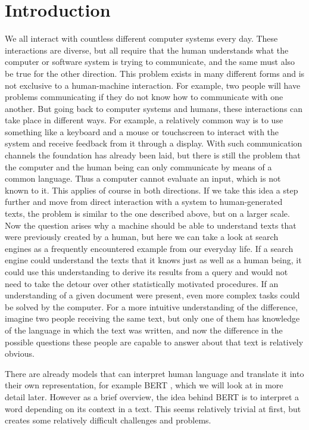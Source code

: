 \chapter{Introduction}
We all interact with countless different computer systems every day. These interactions are diverse, but all require that the human understands what the computer or software system is trying to communicate, and the same must also be true for the other direction. This problem exists in many different forms and is not exclusive to a human-machine interaction. For example, two people will have problems communicating if they do not know how to communicate with one another. But going back to computer systems and humans, these interactions can take place in different ways. For example, a relatively common way is to use something like a keyboard and a mouse or touchscreen to interact with the system and receive feedback from it through a display. With such communication channels the foundation has already been laid, but there is still the problem that the computer and the human being can only communicate by means of a common language. Thus a computer cannot evaluate an input, which is not known to it. This applies of course in both directions. If we take this idea a step further and move from direct interaction with a system to human-generated texts, the problem is similar to the one described above, but on a larger scale. Now the question arises why a machine should be able to understand texts that were previously created by a human, but here we can take a look at search engines as a frequently encountered example from our everyday life. If a search engine could understand the texts that it knows just as well as a human being, it could use this understanding to derive its results from a query and would not need to take the detour over other statistically motivated procedures. If an understanding of a given document were present, even more complex tasks could be solved by the computer. For a more intuitive understanding of the difference, imagine two people receiving the same text, but only one of them has knowledge of the language in which the text was written, and now the difference in the possible questions these people are capable to answer about that text is relatively obvious.

There are already models that can interpret human language and translate it into their own representation, for example BERT \cite{Devlin2018}, which we will look at in more detail later. However as a brief overview, the idea behind BERT is to interpret a word depending on its context in a text. This seems relatively trivial at first, but creates some relatively difficult challenges and problems.  

